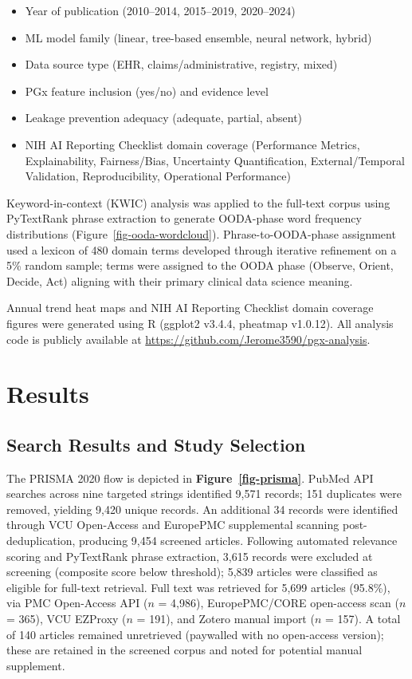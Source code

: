 \documentclass[
  12pt,
]{book}
\providecommand{\tightlist}{%
  \setlength{\itemsep}{0pt}\setlength{\parskip}{0pt}}
\begin{document}
\begin{itemize}
\tightlist
\item
  Year of publication (2010--2014, 2015--2019, 2020--2024)
\item
  ML model family (linear, tree-based ensemble, neural network, hybrid)
\item
  Data source type (EHR, claims/administrative, registry, mixed)
\item
  PGx feature inclusion (yes/no) and evidence level
\item
  Leakage prevention adequacy (adequate, partial, absent)
\item
  NIH AI Reporting Checklist domain coverage (Performance Metrics,
  Explainability, Fairness/Bias, Uncertainty Quantification,
  External/Temporal Validation, Reproducibility, Operational
  Performance)
\end{itemize}

Keyword-in-context (KWIC) analysis was applied to the full-text corpus
using PyTextRank phrase extraction to generate OODA-phase word frequency
distributions (Figure~\ref{fig-ooda-wordcloud}). Phrase-to-OODA-phase
assignment used a lexicon of 480 domain terms developed through
iterative refinement on a 5\% random sample; terms were assigned to the
OODA phase (Observe, Orient, Decide, Act) aligning with their primary
clinical data science meaning.

Annual trend heat maps and NIH AI Reporting Checklist domain coverage
figures were generated using R (ggplot2 v3.4.4, pheatmap v1.0.12). All
analysis code is publicly available at
\url{https://github.com/Jerome3590/pgx-analysis}.

\chapter{Results}\label{sec-results}

\section{Search Results and Study
Selection}\label{search-results-and-study-selection}

The PRISMA 2020 flow is depicted in \textbf{Figure~\ref{fig-prisma}}.
PubMed API searches across nine targeted strings identified 9,571
records; 151 duplicates were removed, yielding 9,420 unique records. An
additional 34 records were identified through VCU Open-Access and
EuropePMC supplemental scanning post-deduplication, producing 9,454
screened articles. Following automated relevance scoring and PyTextRank
phrase extraction, 3,615 records were excluded at screening (composite
score below threshold); 5,839 articles were classified as eligible for
full-text retrieval. Full text was retrieved for 5,699 articles
(95.8\%), via PMC Open-Access API (\(n\) = 4,986), EuropePMC/CORE
open-access scan (\(n\) = 365), VCU EZProxy (\(n\) = 191), and Zotero
manual import (\(n\) = 157). A total of 140 articles remained
unretrieved (paywalled with no open-access version); these are retained
in the screened corpus and noted for potential manual supplement.
\end{document}
